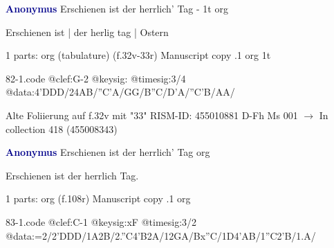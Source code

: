 \documentclass[twocolumn]{book}
\begin{document}
\newline \par \vspace{7pt} \textcolor{darkblue}{\textbf{Anonymus  }}
\newline Erschienen ist der herrlich' Tag - 1t
\newline org
\newline \begin{itshape}[f.32v, at left:] Erschienen ist | der herlig tag | Ostern\end{itshape} 
\newline \textcolor{darkblue}{}  1 parts: org (tabulature)  (f.32v-33r)
\newline Manuscript copy
.1  org  1t  
\begin{filecontents*}{82-1.code}
@clef:G-2
@keysig:
@timesig:3/4
@data:4'DDD/24AB/''C'A/GG/B''C/D'A/''C'B/AA/
\end{filecontents*}
\newline
%

\newline Alte Foliierung auf f.32v mit "33"
\newline RISM-ID: 455010881
\newline D-Fh  Ms 001
\newline $\rightarrow$ In collection 418 (455008343)
      
\newline \par \vspace{7pt} \textcolor{darkblue}{\textbf{Anonymus  }}
\newline Erschienen ist der herrlich' Tag
\newline org
\newline \begin{itshape}[f.108r, heading:] Erschienen ist der herrlich Tag.\end{itshape} 
\newline \textcolor{darkblue}{}  1 parts: org  (f.108r)
\newline Manuscript copy
.1  org  
\begin{filecontents*}{83-1.code}
@clef:C-1
@keysig:xF
@timesig:3/2
@data:=2/2'DDD/1A2B/2.''C4'B2A/12GA/Bx''C/1D4'AB/1''C2'B/1.A/
\end{filecontents*}
\newline
%
\end{document}
